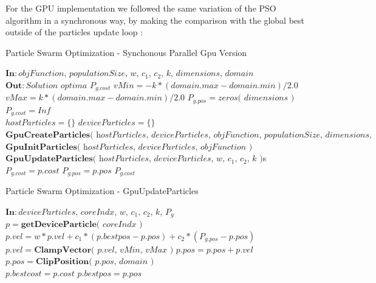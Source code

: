 \documentclass[journal]{IEEEtran}
\begin{document}
For the GPU implementation we followed the same variation of the PSO algorithm in a synchronous way, by making the comparison with the global best outside of the particles update loop :

\begin{algorithm*}
    \caption{Particle Swarm Optimization - Synchonous Parallel Gpu Version}\label{alg:PSOgpu}
    \begin{algorithmic}[1]
        \State $\textbf{In}: \textit{objFunction, populationSize, w, $c_{1}$, $c_{2}$, k, dimensions, domain}$
        \State $\textbf{Out}: \textit{Solution optima } P_{g.cost}$
        \State $vMin = -k * ( domain.max - domain.min ) / 2.0$
        \State $vMax =  k * ( domain.max - domain.min ) / 2.0$
        \State $P_{g.pos} = \textit{zeros( dimensions )}$ 
        \State $P_{g.cost} = Inf$ 
        \\
        \State $hostParticles = \lbrace \rbrace$
        \State $deviceParticles = \lbrace \rbrace$
        \State $\textbf{GpuCreateParticles}\textit{( hostParticles, deviceParticles, objFunction, populationSize, dimensions, domain )}$
        \State $\textbf{GpuInitParticles}\textit{( hostParticles, deviceParticles, objFunction )}$
        \\
         
            \State $\textbf{GpuUpdateParticles}\textit{( hostParticles, deviceParticles, w, $c_{1}$, $c_{2}$, k )}$s
                    \State $P_{g.cost} = p.cost$ 
                    \State $P_{g.pos} = p.pos$
                \EndIf
            \EndFor
        \EndWhile
        \Return $P_{g.cost}$
    \end{algorithmic}
\end{algorithm*}

\begin{algorithm*}
    \caption{Particle Swarm Optimization - GpuUpdateParticles}\label{alg:PSOgpu_kernel_updateparticles}
    \begin{algorithmic}[1]
        \State $\textbf{In}: \textit{deviceParticles, coreIndx, w, $c_{1}$, $c_{2}$, k, $P_{g}$}$
        \State $p = \textbf{getDeviceParticle}\textit{( coreIndx )}$
        \State $p.vel = w * p.vel + 
                        c_{1} * ( p.bestpos - p.pos ) + 
                        c_{2} * ( P_{g.pos} - p.pos )$ 
        \State $p.vel = \textbf{ClampVector}\textit{( p.vel, vMin, vMax )}$
        \State $p.pos = p.pos + p.vel$ 
        \State $p.pos = \textbf{ClipPosition}\textit{( p.pos, domain )}$
        \\
            \State $p.bestcost = p.cost$ 
            \State $p.bestpos = p.pos$
        \EndIf
    \end{algorithmic}
\end{algorithm*}
\end{document}
